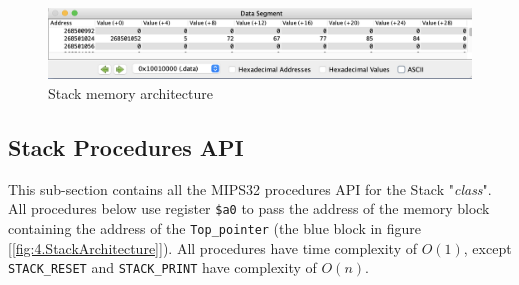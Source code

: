 \begin{figure}[htbp]
    \centering
    \includegraphics[width=1\textwidth]{graphics/3.StackPrintMar.png}
    \caption{Stack memory architecture}
    \label{fig:4.StackPrintMar}
\end{figure}

\subsection{Stack Procedures API}
    This sub-section contains all the MIPS32 procedures API for the Stack "\textit{class}". All procedures below use register \texttt{\$a0} to pass the address of the memory block containing the address of the \texttt{Top\_pointer} (the blue block in figure [\ref{fig:4.StackArchitecture}]). All procedures have time complexity of \(O(1)\), except \texttt{STACK\_RESET} and \texttt{STACK\_PRINT} have complexity of \(O(n)\).


